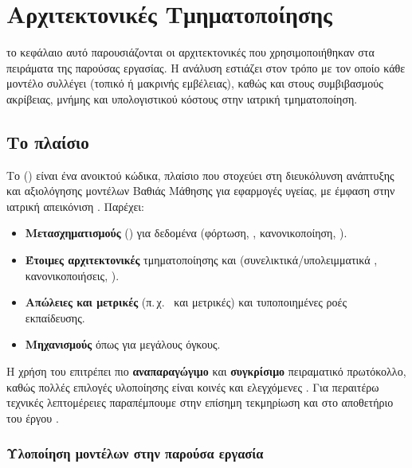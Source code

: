 \chapter{Αρχιτεκτονικές Τμηματοποίησης}
\label{ch:architectures}

το κεφάλαιο αυτό παρουσιάζονται οι αρχιτεκτονικές που χρησιμοποιήθηκαν στα πειράματα της παρούσας εργασίας. 
Η ανάλυση εστιάζει στον τρόπο με τον οποίο κάθε μοντέλο συλλέγει  (τοπικό ή μακρινής εμβέλειας), καθώς και στους συμβιβασμούς ακρίβειας, μνήμης και υπολογιστικού κόστους στην 
 ιατρική τμηματοποίηση.


\section{Το πλαίσιο }
\label{sec:monai_framework}

Το  () είναι ένα ανοικτού κώδικα,
 πλαίσιο που στοχεύει στη διευκόλυνση ανάπτυξης και
αξιολόγησης μοντέλων Βαθιάς Μάθησης για εφαρμογές υγείας, με έμφαση στην
ιατρική απεικόνιση \cite{cardoso2022monai}. Παρέχει:
\begin{itemize}
  \item \textbf{Μετασχηματισμούς} () για  δεδομένα
        (φόρτωση, , κανονικοποίηση, ).
  \item \textbf{Έτοιμες αρχιτεκτονικές} τμηματοποίησης και
         (συνελικτικά/υπολειμματικά ,
        κανονικοποιήσεις, ).
  \item \textbf{Απώλειες και μετρικές} (π.\,χ.\  και
         μετρικές) και τυποποιημένες ροές εκπαίδευσης.
  \item \textbf{Μηχανισμούς } όπως 
        για μεγάλους  όγκους.
\end{itemize}
Η χρήση του  επιτρέπει πιο \textbf{αναπαραγώγιμο} και
\textbf{συγκρίσιμο} πειραματικό πρωτόκολλο, καθώς πολλές επιλογές
υλοποίησης είναι κοινές και ελεγχόμενες \cite{cardoso2022monai}. Για
περαιτέρω τεχνικές λεπτομέρειες παραπέμπουμε στην επίσημη τεκμηρίωση και
στο αποθετήριο του έργου \cite{monai_docs, monai_github}.


\subsection{Υλοποίηση μοντέλων στην παρούσα εργασία}
\label{subsec:implementation_sources}

